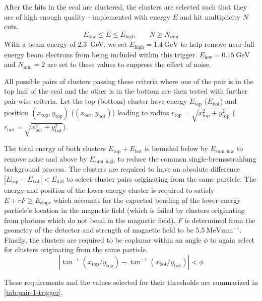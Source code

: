 After the hits in the \ac{ecal} are clustered, the clusters are selected such that they are of
high enough quality - implemented with energy $E$ and hit multiplicity $N$ cuts.
$$
  E_\mathrm{low} \leq E \leq E_\mathrm{high} \qquad N \geq N_\mathrm{min}
$$
With a beam energy of \qty{2.3}{\GeV}, we set $E_\mathrm{high}=\qty{1.4}{\GeV}$ to help remove
near-full-energy beam electrons from being included within this trigger.
$E_\mathrm{low} = \qty{0.15}{\GeV}$ and $N_\mathrm{min}=2$ are set to these values to suppress
the effect of noise.

All possible pairs of clusters passing these criteria where one of the pair is in the top half of
the \ac{ecal} and the other is in the bottom are then tested with further pair-wise criteria.
Let the top (bottom) cluster have energy $E_\mathrm{top}$ ($E_\mathrm{bot}$) and position
$(x_\mathrm{top},y_\mathrm{top})$ ($(x_\mathrm{bot},y_\mathrm{bot})$) leading to radius
$r_\mathrm{top} = \sqrt{x_\mathrm{top}^2+y_\mathrm{top}^2}$
($r_\mathrm{bot} = \sqrt{x_\mathrm{bot}^2+y_\mathrm{bot}^2}$).

The total energy of both clusters $E_\mathrm{top}+E_\mathrm{bot}$ is bounded below
by $E_\mathrm{sum,low}$ to remove noise and above by $E_\mathrm{sum,high}$ to reduce
the common single-bremsstrahlung background process.
The clusters are required to have an absolute difference $|E_\mathrm{top}-E_\mathrm{bot}| < E_\mathrm{diff}$
to select cluster pairs originating from the same particle.
The energy and position of the lower-energy cluster is required to satisfy
$E + r F \geq E_\mathrm{slope}$ which accounts for the expected bending of
the lower-energy particle's location in the magnetic field (which is failed
by clusters originating from photons which do not bend in the magnetic field).
$F$ is determined from the geometry of the detector and strength of magnetic
field to be $\qty{5.5}{\MeV\mm^{-1}}$.
Finally, the clusters are required to be coplanar within an angle $\phi$ to
again select for clusters originating from the same particle.
$$
  |\tan^{-1}(x_\mathrm{top}/y_\mathrm{top}) - \tan^{-1}(x_\mathrm{bot}/y_\mathrm{bot})| < \phi
$$

These requirements and the values selected for their thresholds are summarized
in \cref{tab:pair-1-trigger}.

